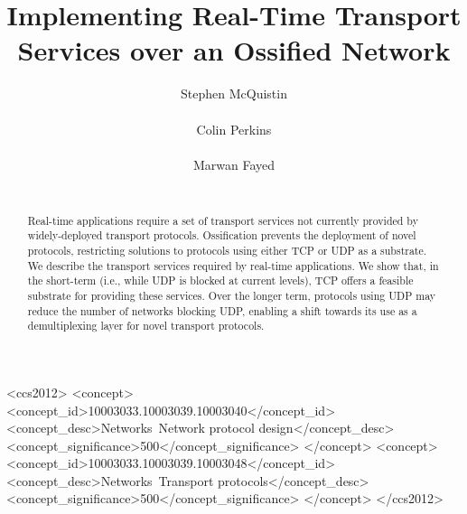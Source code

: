 \documentclass[10pt]{sig-alternate-05-2015}
\begin{document}
\title{Implementing Real-Time Transport Services over an Ossified Network}
\author{
  \alignauthor
    Stephen McQuistin\\
    \\
  \alignauthor
    Colin Perkins\\
    \\
  \alignauthor
    Marwan Fayed\\
    \\
}


\maketitle
\begin{abstract}


Real-time applications require a set of transport services not currently
provided by widely-deployed transport protocols. Ossification prevents the
deployment of novel protocols, restricting solutions to protocols using
either TCP or UDP as a substrate. We describe the transport services
required by real-time applications. We show that, in the short-term (i.e.,
while UDP is blocked at current levels), TCP offers a feasible substrate
for providing these services. Over the longer term, protocols using UDP
may reduce the number of networks blocking UDP, enabling a shift towards
its use as a demultiplexing layer for novel transport protocols.

\end{abstract}
\begin{CCSXML}
  <ccs2012>
    <concept>
      <concept_id>10003033.10003039.10003040</concept_id>
      <concept_desc>Networks~Network protocol design</concept_desc>
      <concept_significance>500</concept_significance>
    </concept>
    <concept>
      <concept_id>10003033.10003039.10003048</concept_id>
      <concept_desc>Networks~Transport protocols</concept_desc>
      <concept_significance>500</concept_significance>
    </concept>
  </ccs2012>
\end{CCSXML}
\end{document}
